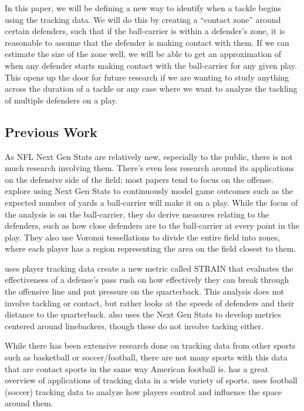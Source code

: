 \documentclass[
  12pt]{article}
\begin{document}
In this paper, we will be defining a new way to identify when a tackle
begins using the tracking data. We will do this by creating a ``contact
zone'' around certain defenders, such that if the ball-carrier is within
a defender's zone, it is reasonable to assume that the defender is
making contact with them. If we can estimate the size of the zone well,
we will be able to get an approximation of when any defender starts
making contact with the ball-carrier for any given play. This opens up
the door for future research if we are wanting to study anything across
the duration of a tackle or any case where we want to analyze the
tackling of multiple defenders on a play.

\subsection{Previous Work}\label{previous-work}

As NFL Next Gen Stats are relatively new, especially to the public,
there is not much research involving them. There's even less research
around its applications on the defensive side of the field; most papers
tend to focus on the offense. \citet{Yurko2020} explore using Next Gen
Stats to continuously model game outcomes such as the expected number of
yards a ball-carrier will make it on a play. While the focus of the
analysis is on the ball-carrier, they do derive measures relating to the
defenders, such as how close defenders are to the ball-carrier at every
point in the play. They also use Voronoi tessellations to divide the
entire field into zones, where each player has a region representing the
area on the field closest to them.

\citet{STRAIN} uses player tracking data create a new metric called
STRAIN that evaluates the effectiveness of a defense's pass rush on how
effectively they can break through the offensive line and put pressure
on the quarterback. This analysis does not involve tackling or contact,
but rather looks at the speeds of defenders and their distance to the
quarterback. \citet{Eager} also uses the Next Gen Stats to develop
metrics centered around linebackers, though these do not involve tacking
either.

While there has been extensive research done on tracking data from other
sports such as basketball or soccer/football, there are not many sports
with this data that are contact sports in the same way American football
is. \citet{Gudmundsson} has a great overview of applications of tracking
data in a wide variety of sports. \citet{wideopenspaces} uses football
(soccer) tracking data to analyze how players control and influence the
space around them.
\end{document}
